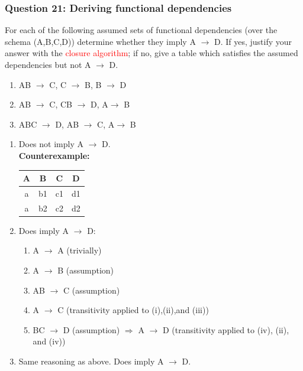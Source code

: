 \subsubsection{Question 21: Deriving functional dependencies}

For each of the following assumed sets of functional dependencies (over the schema (A,B,C,D)) determine
whether they imply A $\rightarrow$ D. If yes, justify your answer with the \textcolor{red}{closure algorithm}; if no, give a table which
satisfies the assumed dependencies but not A $\rightarrow$ D.

\begin{enumerate}[label=\alph*.]
  \item AB $\rightarrow$ C, C $\rightarrow$ B, B $\rightarrow$ D
  \item AB $\rightarrow$ C, CB $\rightarrow$ D, A$\rightarrow$ B
  \item ABC $\rightarrow$ D, AB $\rightarrow$ C, A$\rightarrow$ B
\end{enumerate}

\begin{enumerate}[label=\alph*.]
  \item Does not imply A $\rightarrow$ D.\\
  \textbf{Counterexample:}

  \begin{tabular}{|c|c|c|c|}
  \hline
  A & B & C & D \\
  \hline
  a & b1 & c1 & d1 \\
  a & b2 & c2 & d2 \\
  \hline
  \end{tabular}

  \item Does imply A $\rightarrow$ D:
  \begin{enumerate}[label=\roman*.]
    \item A $\rightarrow$ A (trivially)
    \item A $\rightarrow$ B (assumption)
    \item AB $\rightarrow$ C (assumption) 
    \item A $\rightarrow$ C (transitivity applied to (i),(ii),and (iii))
    \item BC $\rightarrow$ D (assumption) $\Rightarrow$ A $\rightarrow$ D (transitivity applied to (iv), (ii), and (iv))
  \end{enumerate}

  \item Same reasoning as above. Does imply A $\rightarrow$ D.
\end{enumerate}

